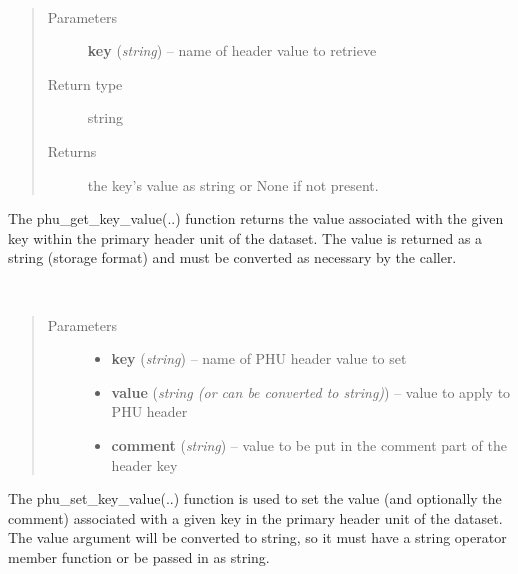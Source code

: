 \documentclass[letterpaper,10pt,english]{sphinxmanual}
\begin{document}
\begin{fulllineitems}
\label{chapter_AstroDataClass:astrodata.data.AstroData.phu_get_key_value}~\begin{quote}\begin{description}
\item[{Parameters}] \leavevmode
\textbf{key} (\emph{string}) -- name of header value to retrieve

\item[{Return type}] \leavevmode
string

\item[{Returns}] \leavevmode
the key's value as string or None if not present.

\end{description}\end{quote}

The phu\_get\_key\_value(..) function returns the value associated with the
given key within the primary header unit
of the dataset. The value is returned as a string (storage format)
and must be converted as necessary by the caller.

\end{fulllineitems}



\begin{fulllineitems}
\label{chapter_AstroDataClass:astrodata.data.AstroData.phu_set_key_value}~\begin{quote}\begin{description}
\item[{Parameters}] \leavevmode\begin{itemize}
\item {} 
\textbf{key} (\emph{string}) -- name of PHU header value to set

\item {} 
\textbf{value} (\emph{string (or can be converted to string)}) -- value to apply to PHU header

\item {} 
\textbf{comment} (\emph{string}) -- value to be put in the comment part of the header key

\end{itemize}

\end{description}\end{quote}

The phu\_set\_key\_value(..) function is used to set the value  (and
optionally the comment) associated with a given key in the primary
header unit of the dataset. The value argument will be converted to
string, so it must have a string operator member function or be passed
in as string.

\end{fulllineitems}
\end{document}
